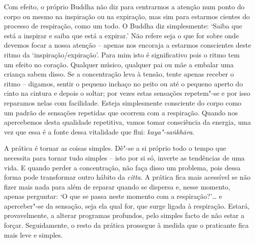 \enlargethispage{\baselineskip}

Com efeito, o próprio Buddha não diz para centrarmos a atenção num ponto do
corpo ou mesmo na inspiração ou na expiração, mas sim para estarmos cientes do
processo de respiração, como um todo. O Buddha diz simplesmente: `Saiba que está
a inspirar e saiba que está a expirar.'
Não refere seja o que for sobre onde devemos focar a nossa atenção -- apenas nos
encoraja a estarmos conscientes deste ritmo da `inspiração/expiração'. Para mim
isto é significativo pois o ritmo tem um efeito no coração. Qualquer músico,
qualquer pai ou mãe a embalar uma criança sabem disso. Se a concentração leva à
tensão, tente apenas receber o ritmo -- digamos, sentir o pequeno inchaço no
peito ou até o pequeno aperto do cinto na cintura e depois o soltar; por vezes
estas sensações repetem"-se e por isso reparamos nelas com facilidade. Esteja
simplesmente consciente do corpo como um padrão de sensações repetidas que
ocorrem com a respiração. Quando nos apercebemos desta qualidade repetitiva,
vamos tomar consciência da energia, uma vez que essa é a fonte dessa vitalidade
que flui: \emph{kaya"-saṅkhāra}.

A prática é tornar as coisas simples. Dê"-se a si próprio todo o tempo que
necessita para tornar tudo simples -- isto por si só, inverte as tendências de
uma vida. E quando perder a concentração, não faça disso um problema, pois dessa
forma pode transformar outro hábito da \emph{citta}. A prática fica mais
acessível se não fizer mais nada para além de reparar quando se dispersa e,
nesse momento, apenas perguntar: `O que se passa neste momento com a
respiração?'\ldots{} e aperceber"-se da sensação, seja ela qual for, que surge ligada
à respiração. Estará, provavelmente, a alterar programas profundos, pelo simples
facto de não estar a forçar. Seguidamente, o resto da prática prossegue à medida
que o praticante fica mais leve e simples.

